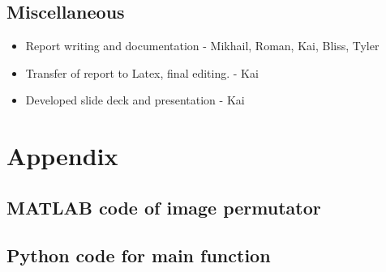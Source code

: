 \documentclass[a4paper,12pt]{article}
\begin{document}
\subsection{Miscellaneous}
	\begin{itemize}
		\item Report writing and documentation - Mikhail, Roman, Kai, Bliss, Tyler 
		\item Transfer of report to Latex, final editing. - Kai
		\item Developed slide deck and presentation - Kai	
	\end{itemize}

 
	
	
\section{Appendix}

\subsection{MATLAB code of image permutator}
	

\subsection{Python code for main function}
	

	
\end{document}
